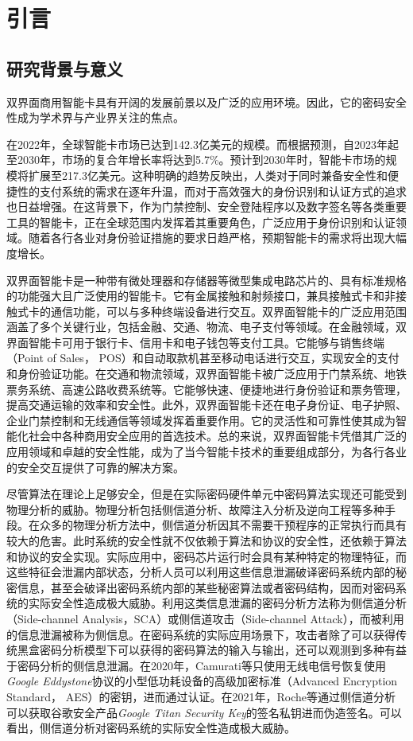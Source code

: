 \chapter{引言}\label{chap:introduction}{
	\section{研究背景与意义}
	双界面商用智能卡具有开阔的发展前景以及广泛的应用环境。因此，它的密码安全性成为学术界与产业界关注的焦点。
	
	在2022年，全球智能卡市场已达到142.3亿美元的规模。而根据预测，自2023年起至2030年，市场的复合年增长率将达到5.7\%\citep{GVR-1-68038-464-2}。预计到2030年时，智能卡市场的规模将扩展至217.3亿美元。这种明确的趋势反映出，人类对于同时兼备安全性和便捷性的支付系统的需求在逐年升温，而对于高效强大的身份识别和认证方式的追求也日益增强。在这背景下，作为门禁控制、安全登陆程序以及数字签名等各类重要工具的智能卡，正在全球范围内发挥着其重要角色，广泛应用于身份识别和认证领域。随着各行各业对身份验证措施的要求日趋严格，预期智能卡的需求将出现大幅度增长。
	
	双界面智能卡是一种带有微处理器和存储器等微型集成电路芯片的、具有标准规格的功能强大且广泛使用的智能卡。它有金属接触和射频接口，兼具接触式卡和非接触式卡的通信功能，可以与多种终端设备进行交互。双界面智能卡的广泛应用范围涵盖了多个关键行业，包括金融、交通、物流、电子支付等领域。在金融领域，双界面智能卡可用于银行卡、信用卡和电子钱包等支付工具。它能够与销售终端（Point of Sales， POS）和自动取款机甚至移动电话进行交互，实现安全的支付和身份验证功能。在交通和物流领域，双界面智能卡被广泛应用于门禁系统、地铁票务系统、高速公路收费系统等。它能够快速、便捷地进行身份验证和票务管理，提高交通运输的效率和安全性。此外，双界面智能卡还在电子身份证、电子护照、企业门禁控制和无线通信等领域发挥着重要作用。它的灵活性和可靠性使其成为智能化社会中各种商用安全应用的首选技术。总的来说，双界面智能卡凭借其广泛的应用领域和卓越的安全性能，成为了当今智能卡技术的重要组成部分，为各行各业的安全交互提供了可靠的解决方案。
	
	尽管算法在理论上足够安全，但是在实际密码硬件单元中密码算法实现还可能受到物理分析的威胁。物理分析包括侧信道分析、故障注入分析\citep{Biham97}及逆向工程\citep{Perrin17}等多种手段。在众多的物理分析方法中，侧信道分析因其不需要干预程序的正常执行而具有较大的危害。此时系统的安全性就不仅依赖于算法和协议的安全性，还依赖于算法和协议的安全实现。实际应用中，密码芯片运行时会具有某种特定的物理特征，而这些特征会泄漏内部状态，分析人员可以利用这些信息泄漏破译密码系统内部的秘密信息，甚至会破译出密码系统内部的某些秘密算法或者密码结构，因而对密码系统的实际安全性造成极大威胁。利用这类信息泄漏的密码分析方法称为侧信道分析（Side-channel Analysis，SCA）或侧信道攻击（Side-channel Attack），而被利用的信息泄漏被称为侧信息。在密码系统的实际应用场景下，攻击者除了可以获得传统黑盒密码分析模型下可以获得的密码算法的输入与输出，还可以观测到多种有益于密码分析的侧信息泄漏。在2020年，Camurati等\citep{Camurati20}只使用无线电信号恢复使用\textit{Google Eddystone}\citep{Eddystone}协议的小型低功耗设备的高级加密标准（Advanced Encryption Standard， AES）的密钥，进而通过认证。在2021年，Roche等\citep{Roche21}通过侧信道分析可以获取谷歌安全产品\textit{Google Titan Security Key}\citep{Titan}的签名私钥进而伪造签名。{\color{\xchange}可以看出，侧信道分析对密码系统的实际安全性造成极大威胁。}
	
}
